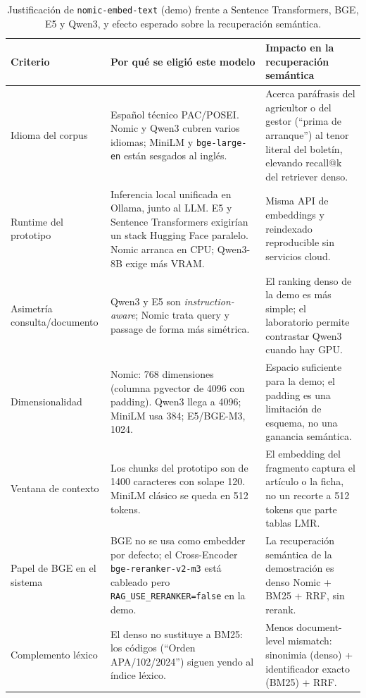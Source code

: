 \begin{table}[htbp]
\centering
\caption{Justificación de \texttt{nomic-embed-text} (demo) frente a Sentence Transformers, BGE, E5 y Qwen3, y efecto esperado sobre la recuperación semántica.}
\label{tab:embedding-eleccion}
\small
\begin{tabular}{p{3.1cm}p{6.2cm}p{5.5cm}}
\toprule
\textbf{Criterio} & \textbf{Por qué se eligió este modelo} & \textbf{Impacto en la recuperación semántica} \\
\midrule
Idioma del corpus & Español técnico PAC/POSEI. Nomic y Qwen3 cubren varios idiomas; MiniLM y \texttt{bge-large-en} están sesgados al inglés. & Acerca paráfrasis del agricultor o del gestor (``prima de arranque'') al tenor literal del boletín, elevando recall@k del retriever denso. \\
\addlinespace
Runtime del prototipo & Inferencia local unificada en Ollama, junto al LLM. E5 y Sentence Transformers exigirían un stack Hugging Face paralelo. Nomic arranca en CPU; Qwen3-8B exige más VRAM. & Misma API de embeddings y reindexado reproducible sin servicios cloud. \\
\addlinespace
Asimetría consulta/documento & Qwen3 y E5 son \emph{instruction-aware}; Nomic trata query y passage de forma más simétrica. & El ranking denso de la demo es más simple; el laboratorio permite contrastar Qwen3 cuando hay GPU. \\
\addlinespace
Dimensionalidad & Nomic: 768 dimensiones (columna pgvector de 4096 con padding). Qwen3 llega a 4096; MiniLM usa 384; E5/BGE-M3, 1024. & Espacio suficiente para la demo; el padding es una limitación de esquema, no una ganancia semántica. \\
\addlinespace
Ventana de contexto & Los chunks del prototipo son de 1400 caracteres con solape 120. MiniLM clásico se queda en 512 tokens. & El embedding del fragmento captura el artículo o la ficha, no un recorte a 512 tokens que parte tablas LMR. \\
\addlinespace
Papel de BGE en el sistema & BGE no se usa como embedder por defecto; el Cross-Encoder \texttt{bge-reranker-v2-m3} está cableado pero \texttt{RAG\_USE\_RERANKER=false} en la demo. & La recuperación semántica de la demostración es denso Nomic + BM25 + RRF, sin rerank. \\
\addlinespace
Complemento léxico & El denso no sustituye a BM25: los códigos (``Orden APA/102/2024'') siguen yendo al índice léxico. & Menos document-level mismatch: sinonimia (denso) + identificador exacto (BM25) + RRF. \\
\bottomrule
\end{tabular}
\end{table}

